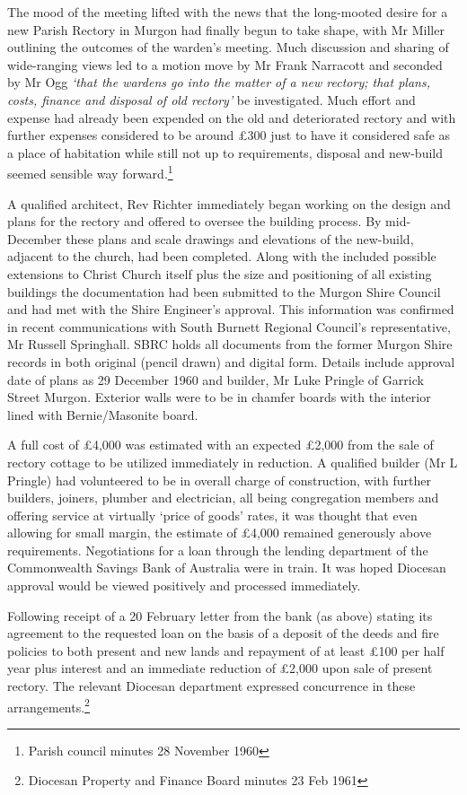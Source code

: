 The mood of the meeting lifted with the news that the long-mooted desire for a new Parish Rectory in Murgon had finally begun to take shape, with Mr Miller outlining the outcomes of the warden's meeting. Much discussion and sharing of wide-ranging views led to a motion move by Mr Frank Narracott and seconded by Mr Ogg \emph{`that the wardens go into the matter of a new rectory; that plans, costs, finance and disposal of old rectory'} be investigated. Much effort and expense had already been expended on the old and deteriorated rectory and with further expenses considered to be around £300 just to have it considered safe as a place of habitation while still not up to requirements, disposal and new-build seemed sensible way forward.\footnote{Parish council minutes 28 November 1960}

A qualified architect, Rev Richter immediately began working on the design and plans for the rectory and offered to oversee the building process. By mid-December these plans and scale drawings and elevations of the new-build, adjacent to the church, had been completed. Along with the included possible extensions to Christ Church itself plus the size and positioning of all existing buildings the documentation had been submitted to the Murgon Shire Council and had met with the Shire Engineer's approval. This information was confirmed in recent communications with South Burnett Regional Council's representative, Mr Russell Springhall. SBRC holds all documents from the former Murgon Shire records in both original (pencil drawn) and digital form. Details include approval date of plans as 29 December 1960 and builder, Mr Luke Pringle of Garrick Street Murgon. Exterior walls were to be in chamfer boards with the interior lined with Bernie/Masonite board.

A full cost of £4,000 was estimated with an expected £2,000 from the sale of rectory cottage to be utilized immediately in reduction. A qualified builder (Mr L Pringle) had volunteered to be in overall charge of construction, with further builders, joiners, plumber and electrician, all being congregation members and offering service at virtually `price of goods' rates, it was thought that even allowing for small margin, the estimate of £4,000 remained generously above requirements. Negotiations for a loan through the lending department of the Commonwealth Savings Bank of Australia were in train. It was hoped Diocesan approval would be viewed positively and processed immediately.

Following receipt of a 20 February letter from the bank (as above) stating its agreement to the requested loan on the basis of a deposit of the deeds and fire policies to both present and new lands and repayment of at least £100 per half year plus interest and an immediate reduction of £2,000 upon sale of present rectory. The relevant Diocesan department expressed concurrence in these arrangements.\footnote{Diocesan Property and Finance Board minutes 23 Feb 1961}

